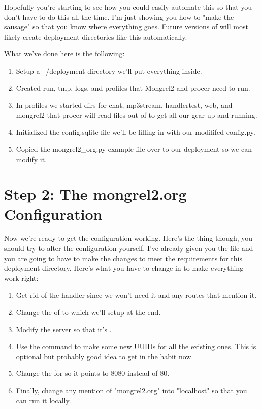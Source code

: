 Hopefully you're starting to see how you could easily automate this so that you don't
have to do this all the time.  I'm just showing you how to "make the sausage" so that
you know where everything goes.  Future versions of  will most likely 
create deployment directories like this automatically.

What we've done here is the following:

\begin{enumerate}
\item Setup a ~/deployment directory we'll put everything inside.
\item Created run, tmp, logs, and profiles that Mongrel2 and procer need to run.
\item In profiles we started dirs for chat, mp3stream, handlertest, web, and mongrel2
    that procer will read files out of to get all our gear up and running.
\item Initialized the config.sqlite file we'll be filling in with our modififed config.py.
\item Copied the mongrel2\_org.py example file over to our deployment so we can modify it.
\end{enumerate}


\section{Step 2: The mongrel2.org Configuration}

Now we're ready to get the configuration working.  Here's the thing though, you should 
try to alter the configuration yourself.  I've already given you the file and you are
going to have to make the changes to meet the requirements for this deployment directory.
Here's what you have to change in  to make everything work right:

\begin{enumerate}
\item Get rid of the  handler since we won't need it and
    any routes that mention it.
\item Change the  of  to  which we'll setup at the end.
\item Modify the server  so that it's .
\item Use the  command to make some new UUIDs for all the 
    existing ones.  This is optional but probably good idea to get in the 
    habit now.
\item Change the  for  so it points to 8080 instead of 80.
\item Finally, change any mention of "mongrel2.org" into "localhost" so that you
    can run it locally.
\end{enumerate}


